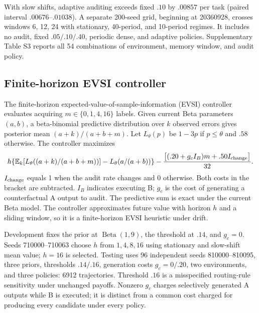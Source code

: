 With slow shifts, adaptive auditing exceeds fixed $.10$ by $.00857$ per task (paired interval $.00676$--$.01038$). A separate 200-seed grid, beginning at 20360928, crosses windows 6, 12, 24 with stationary, 40-period, and 10-period regimes. It includes no audit, fixed $.05/.10/.40$, periodic dense, and adaptive policies. Supplementary Table S3 reports all 54 combinations of environment, memory window, and audit policy.

\subsection{Finite-horizon EVSI controller}
The finite-horizon expected-value-of-sample-information (EVSI) controller evaluates acquiring $m\in\{0,1,4,16\}$ labels. Given current Beta parameters $(a,b)$, a beta-binomial predictive distribution over $k$ observed errors gives posterior mean $(a+k)/(a+b+m)$. Let $L_\theta(p)$ be $1-3p$ if $p\leq\theta$ and $.58$ otherwise. The controller maximizes
\begin{equation}
h\{\mathbb{E}_k[L_\theta((a+k)/(a+b+m))]-L_\theta(a/(a+b))\}
-\frac{\bigl[(.20+g_c I_B)m+.50I_{\rm change}\bigr]}{32}.
\end{equation}
$I_{\rm change}$ equals 1 when the audit rate changes and 0 otherwise. Both costs in the bracket are subtracted. $I_B$ indicates executing B; $g_c$ is the cost of generating a counterfactual A output to audit. The predictive sum is exact under the current Beta model. The controller approximates future value with horizon $h$ and a sliding window, so it is a finite-horizon EVSI heuristic under drift.

Development fixes the prior at $\operatorname{Beta}(1,9)$, the threshold at $.14$, and $g_c=0$. Seeds 710000--710063 choose $h$ from $1,4,8,16$ using stationary and slow-shift mean value; $h=16$ is selected. Testing uses 96 independent seeds 810000--810095, three priors, thresholds $.14/.16$, generation costs $g_c=0/.20$, two environments, and three policies: 6912 trajectories. Threshold $.16$ is a misspecified routing-rule sensitivity under unchanged payoffs. Nonzero $g_c$ charges selectively generated A outputs while B is executed; it is distinct from a common cost charged for producing every candidate under every policy.

